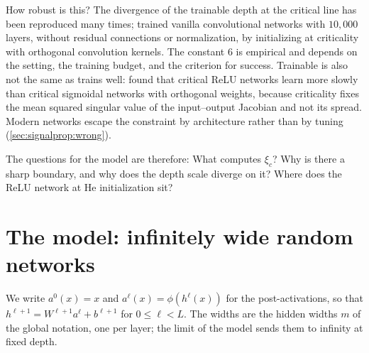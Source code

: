 \begin{refsection}
How robust is this? The divergence of the trainable depth at the critical line has been reproduced many times; \textcite{XiaoEtAl2018} trained vanilla convolutional networks with $10{,}000$ layers, without residual connections or normalization, by initializing at criticality with orthogonal convolution kernels. The constant $6$ is empirical and depends on the setting, the training budget, and the criterion for success. Trainable is also not the same as trains well: \textcite{PenningtonEtAl2017} found that critical ReLU networks learn more slowly than critical sigmoidal networks with orthogonal weights, because criticality fixes the mean squared singular value of the input--output Jacobian and not its spread. Modern networks escape the constraint by architecture rather than by tuning (\cref{sec:signalprop:wrong}).

The questions for the model are therefore: What computes $\xi_c$? Why is there a sharp boundary, and why does the depth scale diverge on it? Where does the ReLU network at He initialization sit?

\section{The model: infinitely wide random networks}\label{sec:signalprop:model}


We write $a^0(x)=x$ and $a^\ell(x)=\phi(h^\ell(x))$ for the post-activations, so that $h^{\ell+1}=W^{\ell+1}a^\ell+b^{\ell+1}$ for $0\le\ell<L$. The widths are the hidden widths $m$ of the global notation, one per layer; the limit of the model sends them to infinity at fixed depth.


\end{refsection}
